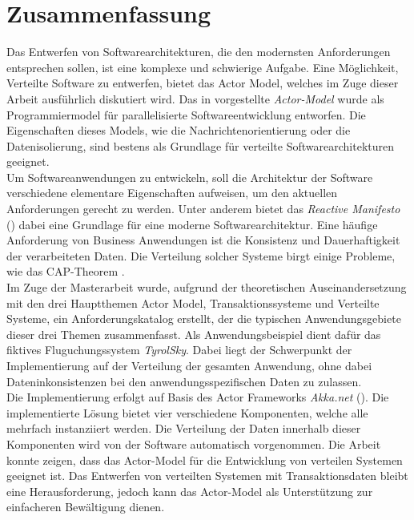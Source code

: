 \chapter*{Zusammenfassung}
Das Entwerfen von Softwarearchitekturen, die den modernsten Anforderungen entsprechen sollen, ist eine komplexe und schwierige Aufgabe. Eine Möglichkeit, Verteilte Software zu entwerfen, bietet das Actor Model, welches im Zuge dieser Arbeit ausführlich diskutiert wird. Das in \cite{Hewitt1973AIntelligence} vorgestellte \textit{Actor-Model} wurde als Programmiermodel für parallelisierte Softwareentwicklung entworfen. Die Eigenschaften dieses Models, wie die Nachrichtenorientierung oder die Datenisolierung, sind bestens als Grundlage für verteilte Softwarearchitekturen geeignet. \\
Um Softwareanwendungen zu entwickeln, soll die Architektur der Software verschiedene elementare Eigenschaften aufweisen, um den aktuellen Anforderungen gerecht zu werden. Unter anderem bietet das \textit{Reactive Manifesto} (\cite{reactiveManifesto}) dabei eine Grundlage für eine moderne Softwarearchitektur. 
Eine häufige Anforderung von Business Anwendungen ist die Konsistenz und Dauerhaftigkeit der verarbeiteten Daten. Die Verteilung solcher Systeme birgt einige Probleme, wie das CAP-Theorem \citep{gilbertPerspectiveCAPTheorem2012}. \\
Im Zuge der Masterarbeit wurde, aufgrund der theoretischen Auseinandersetzung mit den drei Hauptthemen Actor Model, Transaktionssysteme und Verteilte Systeme, ein Anforderungskatalog erstellt, der die typischen Anwendungsgebiete dieser drei Themen zusammenfasst.  Als Anwendungsbeispiel dient dafür das fiktives Fluguchungssystem \textit{TyrolSky}.  Dabei liegt der Schwerpunkt der Implementierung auf der Verteilung der gesamten Anwendung, ohne dabei Dateninkonsistenzen bei den anwendungsspezifischen Daten zu zulassen. \\
Die Implementierung erfolgt auf Basis des Actor Frameworks \textit{Akka.net} (\cite{Akka.netCommunityAkka.NETDocumentation}). Die implementierte Lösung bietet vier verschiedene Komponenten, welche alle mehrfach instanziiert werden. Die Verteilung der Daten innerhalb dieser Komponenten wird von der Software automatisch vorgenommen.
Die Arbeit konnte zeigen, dass das Actor-Model für die Entwicklung von verteilen Systemen geeignet ist. Das Entwerfen von verteilten Systemen mit Transaktionsdaten bleibt eine Herausforderung, jedoch kann das Actor-Model als Unterstützung zur einfacheren Bewältigung dienen.

\cleardoublepage
